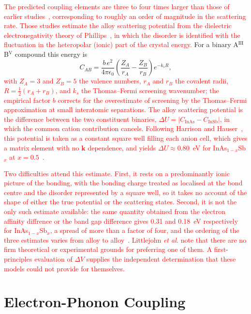 \documentclass[aps,prmaterials,reprint,amsmath,amssymb,superscriptaddress]{revtex4-2}
\begin{document}
\textcolor{red}{The predicted coupling elements are three to four times larger than those of earlier studies~\cite{Littlejohn1978,Chin1991}, corresponding to roughly an order of magnitude in the scattering rate. Those studies estimate the alloy scattering potential from the dielectric electronegativity theory of Phillips~\cite{Phillips1970}, in which the disorder is identified with the fluctuation in the heteropolar (ionic) part of the crystal energy.}
For a binary A$^\text{III}$B$^\text{V}$ compound this energy is
\begin{equation}
    C_{AB} = \frac{b\,e^{2}}{4\pi\epsilon_{0}}
      \left( \frac{Z_{A}}{r_{A}} - \frac{Z_{B}}{r_{B}} \right) e^{-k_{s} R},
\end{equation}
\textcolor{red}{with $Z_A=3$ and $Z_B=5$ the valence numbers, $r_A$ and $r_B$ the covalent radii, $R=\tfrac{1}{2}(r_A+r_B)$, and $k_s$ the Thomas--Fermi screening wavenumber; the empirical factor $b$ corrects for the overestimate of screening by the Thomas--Fermi approximation at small interatomic separations. The alloy scattering potential is the difference between the two constituent binaries, $\Delta U = |C_{\mathrm{InAs}}-C_{\mathrm{InSb}}|$, in which the common cation contribution cancels. Following Harrison and Hauser~\cite{Harrison1976}, this potential is taken as a constant square well filling each anion cell, which gives a matrix element with no $\bm{k}$ dependence, and yields $\Delta U \approx 0.80$~eV for InAs$_{1-x}$Sb$_{x}$ at $x=0.5$~\cite{Littlejohn1978}.}

\textcolor{red}{Two difficulties attend this estimate. First, it rests on a predominantly ionic picture of the bonding, with the bonding charge treated as localised at the bond centre and the disorder represented by a square well, so it takes no account of the shape of either the true potential or the scattering states. Second, it is not the only such estimate available: the same quantity obtained from the electron affinity diffrence or the band gap difference gives 0.31 and 0.18~eV respectively for InAs$_{1-x}$Sb$_{x}$, a spread of more than a factor of four, and the ordering of the three estimates varies from alloy to alloy~\cite{Littlejohn1978}. Littlejohn \textit{et al.} note that there are no firm theoretical or experimental grounds for preferring one of them. A first-principles evaluation of $\Delta V$ supplies the independent determination that these models could not provide for themselves.}

\section{Electron-Phonon Coupling}\label{sec:eph_scattering}
\end{document}
